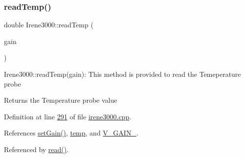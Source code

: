\subsubsection{\texorpdfstring{read\+Temp()}{readTemp()}}
{\footnotesize\ttfamily double Irene3000\+::read\+Temp (\begin{DoxyParamCaption}\item[{ads\+Gain\+\_\+t}]{gain }\end{DoxyParamCaption})}

Irene3000\+::read\+Temp(gain)\+: This method is provided to read the Temeperature probe

\begin{DoxyReturn}{Returns}
the Temperature probe value 
\end{DoxyReturn}


Definition at line \hyperlink{irene3000_8cpp_source_l00291}{291} of file \hyperlink{irene3000_8cpp_source}{irene3000.\+cpp}.



References \hyperlink{irene3000_8cpp_source_l00242}{set\+Gain()}, \hyperlink{_irene3000_8h_source_l00025}{temp}, and \hyperlink{_irene3000_8h_source_l00021}{V\+\_\+\+G\+A\+I\+N\+\_}.



Referenced by \hyperlink{irene3000_8cpp_source_l00035}{read()}.


